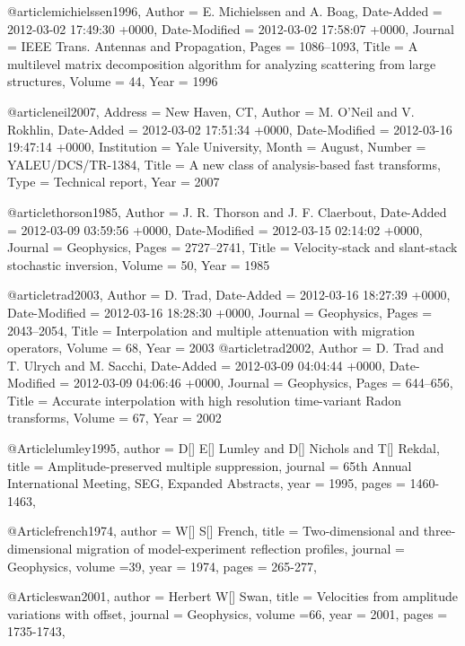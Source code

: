 @article{michielssen1996,
	Author = {E. Michielssen and A. Boag},
	Date-Added = {2012-03-02 17:49:30 +0000},
	Date-Modified = {2012-03-02 17:58:07 +0000},
	Journal = {IEEE Trans. Antennas and Propagation},
	Pages = {1086--1093},
	Title = {A multilevel matrix decomposition algorithm for analyzing scattering from large structures},
	Volume = {44},
	Year = {1996}}

@article{neil2007,
	Address = {New Haven, CT},
	Author = {M. O'Neil and V. Rokhlin},
	Date-Added = {2012-03-02 17:51:34 +0000},
	Date-Modified = {2012-03-16 19:47:14 +0000},
	Institution = {Yale University},
	Month = {August},
	Number = {YALEU/DCS/TR-1384},
	Title = {A new class of analysis-based fast transforms},
	Type = {Technical report},
	Year = {2007}}

@article{thorson1985,
	Author = {J. R. Thorson and J. F. Claerbout},
	Date-Added = {2012-03-09 03:59:56 +0000},
	Date-Modified = {2012-03-15 02:14:02 +0000},
	Journal = {Geophysics},
	Pages = {2727--2741},
	Title = {Velocity-stack and slant-stack stochastic inversion},
	Volume = {50},
	Year = {1985}}

@article{trad2003,
	Author = {D. Trad},
	Date-Added = {2012-03-16 18:27:39 +0000},
	Date-Modified = {2012-03-16 18:28:30 +0000},
	Journal = {Geophysics},
	Pages = {2043--2054},
	Title = {Interpolation and multiple attenuation with migration operators},
	Volume = {68},
	Year = {2003}}
@article{trad2002,
	Author = {D. Trad and T. Ulrych and M. Sacchi},
	Date-Added = {2012-03-09 04:04:44 +0000},
	Date-Modified = {2012-03-09 04:06:46 +0000},
	Journal = {Geophysics},
	Pages = {644--656},
	Title = {Accurate interpolation with high resolution time-variant {R}adon transforms},
	Volume = {67},
	Year = {2002}}

@Article{lumley1995,
  author = 	 {D[] E[] Lumley and D[] Nichols and T[] Rekdal},
  title = 	 {Amplitude-preserved multiple suppression},
  journal = 	 {65th Annual International Meeting, SEG, Expanded Abstracts},
  year = 	 1995,
  pages =	 {1460-1463},
}

@Article{french1974,
  author = 	 {W[] S[] French},
  title = 	 {Two-dimensional and three-dimensional migration of model-experiment reflection profiles},
  journal = 	 {Geophysics},
  volume ={39},
  year = 	 1974,
  pages =	 {265-277},
}

@Article{swan2001,
  author = 	 {Herbert W[] Swan},
  title = 	 {Velocities from amplitude variations with offset},
  journal = 	 {Geophysics},
  volume ={66},
  year = 	 2001,
  pages =	 {1735-1743},
}


